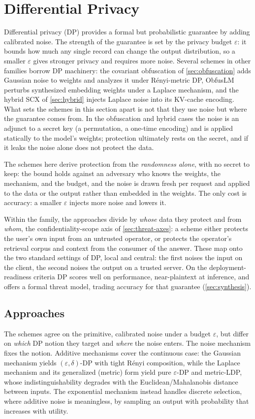 \section{Differential Privacy}
\label{sec:dp}

Differential privacy (DP) provides a formal but probabilistic guarantee by adding calibrated
noise. The strength of the guarantee is set by the privacy budget $\varepsilon$: it bounds how much
any single record can change the output distribution, so a smaller $\varepsilon$ gives stronger
privacy and requires more noise. Several schemes in other families borrow DP machinery: the covariant obfuscation of
\cref{sec:obfuscation} adds Gaussian noise to weights and analyzes it under Rényi-metric
DP, ObfusLM perturbs synthesized embedding weights under a Laplace mechanism, and the
hybrid SCX of \cref{sec:hybrid} injects Laplace noise into its KV-cache encoding. What sets the
schemes in this section apart is not that they use noise but where the guarantee comes from. In
the obfuscation and hybrid cases the noise is an adjunct to a secret key (a permutation, a
one-time encoding) and is applied statically to the model's weights; protection ultimately
rests on the secret, and if it leaks the noise alone does not protect the data.

The schemes here derive
protection from the \emph{randomness alone}, with no secret to keep: the bound holds against an
adversary who knows the weights, the mechanism, and the budget, and the noise is drawn
fresh per request and applied to the data or the output rather than embedded in the
weights. The only cost is accuracy: a smaller $\varepsilon$ injects more noise and lowers it.

Within the family, the approaches divide by \emph{whose} data they protect and from \emph{whom},
the confidentiality-scope axis of \cref{sec:threat-axes}: a scheme either protects the user's own
input from an untrusted operator, or protects the operator's retrieval corpus and context from the
consumer of the answer. These map onto the two standard settings of DP, local and central: the
first noises the input on the client, the second noises the output on a trusted server. On the deployment-readiness criteria DP
scores well on performance, near-plaintext at inference, and offers a formal threat model,
trading accuracy for that guarantee (\cref{sec:synthesis}).

\subsection{Approaches}
The schemes agree on the primitive, calibrated noise under a budget $\varepsilon$, but differ on
\emph{which} DP notion they target and \emph{where} the noise enters. The noise mechanism fixes
the notion. Additive mechanisms cover the continuous case: the Gaussian mechanism yields
$(\varepsilon,\delta)$-DP with tight Rényi composition, while the Laplace mechanism and its
generalized (metric) form yield pure $\varepsilon$-DP and metric-LDP, whose indistinguishability
degrades with the Euclidean/Mahalanobis distance between inputs. The exponential mechanism instead
handles discrete selection, where additive noise is meaningless, by sampling an output with
probability that increases with utility.


